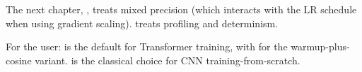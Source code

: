 The next chapter, , treats mixed precision (which
interacts with the LR schedule when using gradient scaling).
 treats profiling and determinism.

\begin{lucidnote}
For the user:  is the default for
Transformer training, with  for the
warmup-plus-cosine variant.  is the classical
choice for CNN training-from-scratch.
\end{lucidnote}
